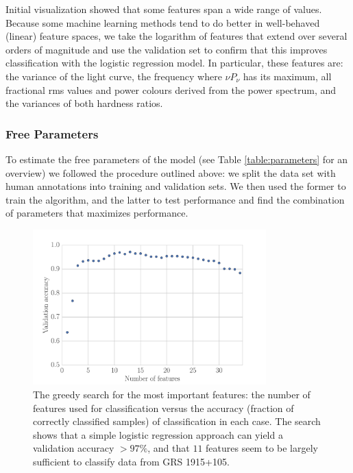 \documentclass[12pt]{emulateapj}
\begin{document}
Initial visualization showed that some features span a wide range of values. Because some machine learning methods tend to do better in well-behaved (linear) feature spaces, we take the logarithm of features that extend over several orders of magnitude and use the validation set to confirm that this improves classification with the logistic regression model. In particular, these features are: the variance of the light curve, the frequency where $\nu P_\nu$ has its maximum, all fractional rms values and power colours derived from the power spectrum, and the variances of both hardness ratios. 

\subsubsection{Free Parameters}
\label{sec:freeparams}

To estimate the free parameters of the model (see Table \ref{table:parameters} for an overview) we followed the procedure outlined above: we split the data set with human annotations into training and validation sets. We then used the former to train the algorithm, and the latter to test performance and find the combination of parameters that maximizes performance.

\begin{figure}[htbp]
\begin{center}
\includegraphics[width=9cm]{grs1915_feature_accuracy}
\caption{The greedy search for the most important features: the number of features used for classification versus the accuracy (fraction of correctly classified samples) of classification in each case. The search shows that a simple logistic regression approach can yield a validation accuracy $>97\%$, and that $11$ features seem to be largely sufficient to classify data from GRS 1915+105.}
\label{fig:scores}
\end{center}
\end{figure}
\end{document}
